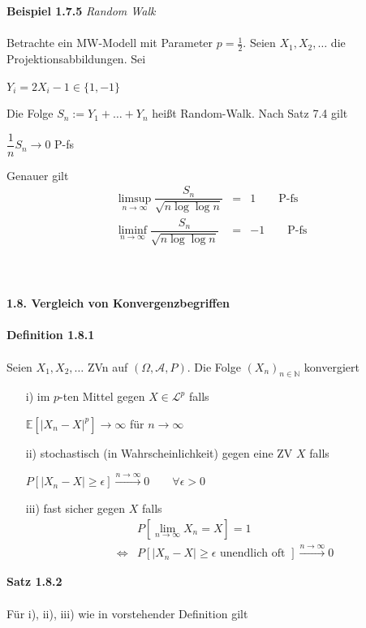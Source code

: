 \documentclass[10pt,a4paper]{report}
\newcommand{\E}{\mathbb{E}}
\newcommand{\N}{\mathbb{N}}
\numberwithin{equation}{section}
\numberwithin{figure}{section}
\theoremstyle{plain}
\theoremstyle{definition}
\theoremstyle{plain}
\theoremstyle{definition}
\theoremstyle{remark}
\theoremstyle{plain}
\begin{document}
\textbf{Beispiel 1.7.5} \textit{Random Walk}\\\\
Betrachte ein MW-Modell mit Parameter $p=\frac{1}{2}$. Seien $X_1,X_2,\ldots$ die Projektionsabbildungen. Sei
\begin{center}
$Y_i=2X_i-1 \in \{1,-1\}$
\end{center}
Die Folge $S_n:=Y_1+\ldots+Y_n$ heißt Random-Walk. Nach Satz 7.4 gilt
\begin{center}
$\dfrac{1}{n}S_n \to 0$ P-fs
\end{center}
Genauer gilt
\begin{eqnarray*}
\limsup\limits_{n \to\infty}\dfrac{S_n}{\sqrt{n\log\log n}}&=& 1 \qquad \text{P-fs}\\
\liminf\limits_{n \to\infty}\dfrac{S_n}{\sqrt{n\log\log n}}&=& -1 \qquad \text{P-fs}
\end{eqnarray*}
\\\\\\
\Large{\textbf{1.8. Vergleich von Konvergenzbegriffen}}\normalsize\\\\
\textbf{Definition 1.8.1}\\\\
Seien $X_1,X_2,\ldots$ ZVn auf $(\Omega,\mathcal{A},P)$. Die Folge $(X_n)_{n \in \N}$ konvergiert
\begin{itemize}
\item[i)] im $p$-ten Mittel gegen $X \in \mathcal{L}^p$ falls
\begin{center}
$\E[|X_n-X|^p] \to \infty$ für $n \to \infty$
\end{center}
\item[ii)] stochastisch (in Wahrscheinlichkeit) gegen eine ZV $X$ falls
\begin{center}
$P[|X_n-X|\geq \epsilon ] \overset{n \to \infty}{\to} 0\qquad \forall \epsilon >0$
\end{center}
\item[iii)] fast sicher gegen $X$ falls
\begin{eqnarray*}
&& P\left[\lim\limits_{n \to \infty}X_n=X \right]=1\\
&\Leftrightarrow &P[|X_n-X|\geq \epsilon \text{ unendlich oft }] \overset{n \to \infty}{\to} 0
\end{eqnarray*}
\end{itemize} 
\textbf{Satz 1.8.2}\\\\
Für i), ii), iii) wie in vorstehender Definition gilt
\end{document}
